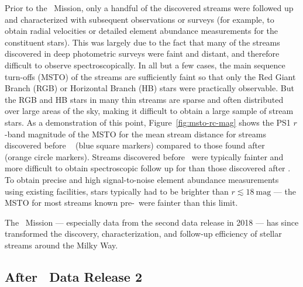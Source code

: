 \documentclass[final,5p,times,twocolumn,authoryear]{elsarticle}
\begin{document}
Prior to the \gaia\ Mission, only a handful of the discovered streams were followed up
and characterized with subsequent observations or surveys (for example, to obtain radial
velocities or detailed element abundance measurements for the constituent stars).
This was largely due to the fact that many of the streams discovered in deep photometric
surveys were faint and distant, and therefore difficult to observe spectroscopically.
In all but a few cases, the main sequence turn-offs (MSTO) of the streams are
sufficiently faint so that only the Red Giant Branch (RGB) or Horizontal Branch (HB)
stars were practically observable.
But the RGB and HB stars in many thin streams are sparse and often distributed over
large areas of the sky, making it difficult to obtain a large sample of stream stars.
As a demonstration of this point, Figure~\ref{fig:msto-rc-mag} shows the PS1 $r$-band
magnitude of the MSTO for the mean stream distance for streams discovered before \gaia\
 (blue square markers) compared to those found after \gaia\  (orange circle
markers).
Streams discovered before \gaia\ were typically fainter and more difficult to obtain
spectroscopic follow up for than those discovered after \gaia.
To obtain precise and high signal-to-noise element abundance measurements using existing
facilities, stars typically had to be brighter than $r \lesssim 18~\textrm{mag}$ --- the
MSTO for most streams known pre-\gaia\ were fainter than this limit.

The \gaia\ Mission --- especially data from the second data release in 2018 --- has
since transformed the discovery, characterization, and follow-up efficiency of stellar
streams around the Milky Way.


\subsection{After \gaia\ Data Release 2}
\end{document}
